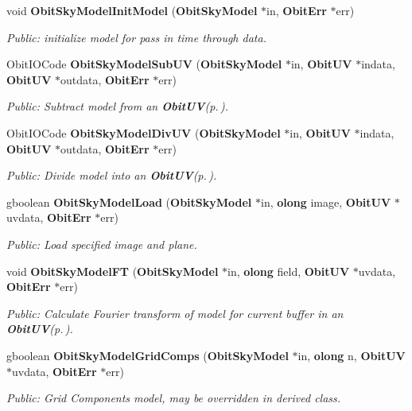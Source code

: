 \begin{CompactItemize}
void {\bf Obit\-Sky\-Model\-Init\-Model} ({\bf Obit\-Sky\-Model} $\ast$in, {\bf Obit\-Err} $\ast$err)
\begin{CompactList}\small\item\em Public: initialize model for pass in time through data. \item\end{CompactList}\item 
Obit\-IOCode {\bf Obit\-Sky\-Model\-Sub\-UV} ({\bf Obit\-Sky\-Model} $\ast$in, {\bf Obit\-UV} $\ast$indata, {\bf Obit\-UV} $\ast$outdata, {\bf Obit\-Err} $\ast$err)
\begin{CompactList}\small\item\em Public: Subtract model from an {\bf Obit\-UV}{\rm (p.\,\pageref{structObitUV})}. \item\end{CompactList}\item 
Obit\-IOCode {\bf Obit\-Sky\-Model\-Div\-UV} ({\bf Obit\-Sky\-Model} $\ast$in, {\bf Obit\-UV} $\ast$indata, {\bf Obit\-UV} $\ast$outdata, {\bf Obit\-Err} $\ast$err)
\begin{CompactList}\small\item\em Public: Divide model into an {\bf Obit\-UV}{\rm (p.\,\pageref{structObitUV})}. \item\end{CompactList}\item 
gboolean {\bf Obit\-Sky\-Model\-Load} ({\bf Obit\-Sky\-Model} $\ast$in, {\bf olong} image, {\bf Obit\-UV} $\ast$uvdata, {\bf Obit\-Err} $\ast$err)
\begin{CompactList}\small\item\em Public: Load specified image and plane. \item\end{CompactList}\item 
void {\bf Obit\-Sky\-Model\-FT} ({\bf Obit\-Sky\-Model} $\ast$in, {\bf olong} field, {\bf Obit\-UV} $\ast$uvdata, {\bf Obit\-Err} $\ast$err)
\begin{CompactList}\small\item\em Public: Calculate Fourier transform of model for current buffer in an {\bf Obit\-UV}{\rm (p.\,\pageref{structObitUV})}. \item\end{CompactList}\item 
gboolean {\bf Obit\-Sky\-Model\-Grid\-Comps} ({\bf Obit\-Sky\-Model} $\ast$in, {\bf olong} n, {\bf Obit\-UV} $\ast$uvdata, {\bf Obit\-Err} $\ast$err)
\begin{CompactList}\small\item\em Public: Grid Components model, may be overridden in derived class. \item\end{CompactList}\item 

\end{CompactItemize}

